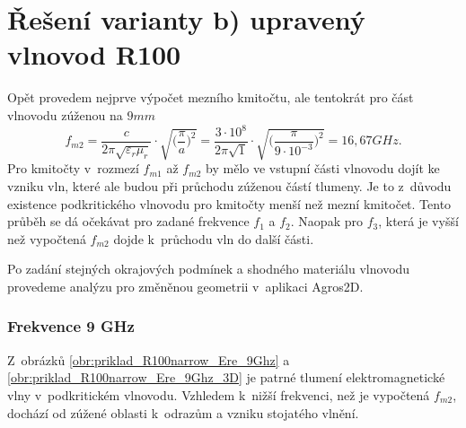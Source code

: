 \section{Řešení varianty b) upravený vlnovod R100}
Opět provedem nejprve výpočet mezního kmitočtu, ale tentokrát pro část vlnovodu zúženou na $9\unit{mm}$
\begin{displaymath}
f_{m2} = \frac{c}{2\pi\sqrt{\varepsilon_{r}\mu_{r}}}\cdot\sqrt{\bigg(\frac{\pi}{a}\bigg)^{2}} = \frac{3\cdot 10^{8}}{2\pi\sqrt{1}}\cdot\sqrt{\bigg(\frac{\pi}{9\cdot 10^{-3}}\bigg)^{2}} = 16,67 \unit{GHz}.
\end{displaymath}
Pro kmitočty v~rozmezí $f_{m1}$ až $f_{m2}$ by mělo ve vstupní části vlnovodu dojít ke vzniku vln, které ale budou při průchodu zúženou částí tlumeny. Je to z~důvodu existence  podkritického vlnovodu pro kmitočty menší než mezní kmitočet. Tento průběh se dá očekávat pro zadané frekvence $f_1$ a $f_2$. Naopak pro $f_3$, která je vyšší než vypočtená $f_{m2}$ dojde k~průchodu vln do další části.

Po zadání stejných okrajových podmínek a shodného materiálu vlnovodu provedeme analýzu pro změněnou geometrii v~aplikaci Agros2D.

\subsubsection*{Frekvence 9 GHz}
Z~obrázků \ref{obr:priklad_R100narrow_Ere_9Ghz} a \ref{obr:priklad_R100narrow_Ere_9Ghz_3D} je patrné tlumení elektromagnetické vlny v~podkritickém vlnovodu. Vzhledem k~nižší frekvenci, než je vypočtená $f_{m2}$, dochází od zúžené oblasti k~odrazům a vzniku stojatého vlnění.

